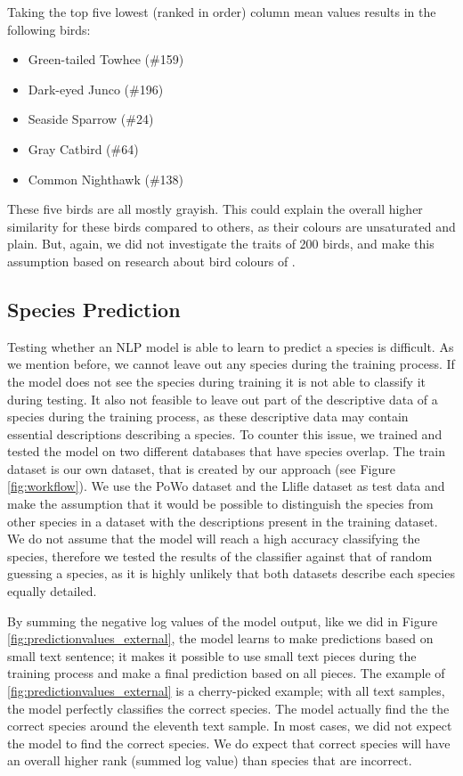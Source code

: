 \documentclass[a4paper, 12pt, oneside]{book} %
\begin{document}
Taking the top five lowest (ranked in order) column mean values results in the following birds: 
\begin{itemize}
    \setlength\itemsep{-0.25em}
    \item Green-tailed Towhee (\#159)
    \item Dark-eyed Junco (\#196)
    \item Seaside Sparrow (\#24)
    \item Gray Catbird (\#64)
    \item Common Nighthawk (\#138)
\end{itemize}
These five birds are all mostly grayish.
This could explain the overall higher similarity for these birds compared to others, as their colours are unsaturated and plain.
But, again, we did not investigate the traits of 200 birds, and make this assumption based on research about bird colours of \textcite{delhey_colour_2016}.

\subsection{Species Prediction}
Testing whether an NLP model is able to learn to predict a species is difficult.
As we mention before, we cannot leave out any species during the training process.
If the model does not see the species during training it is not able to classify it during testing.
It also not feasible to leave out part of the descriptive data of a species during the training process, as these descriptive data may contain essential descriptions describing a species.
To counter this issue, we trained and tested the model on two different databases that have species overlap.
The train dataset is our own dataset, that is created by our approach (see Figure \ref{fig:workflow}).
We use the PoWo dataset and the Llifle dataset as test data and make the assumption that it would be possible to distinguish the species from other species in a dataset with the descriptions present in the training dataset.
We do not assume that the model will reach a high accuracy classifying the species, therefore we tested the results of the classifier against that of random guessing a species, as it is highly unlikely that both datasets describe each species equally detailed.

By summing the negative log values of the model output, like we did in Figure \ref{fig:predictionvalues_external}, the model learns to make predictions based on small text sentence; it makes it possible to use small text pieces during the training process and make a final prediction based on all pieces.
The example of \ref{fig:predictionvalues_external} is a cherry-picked example; with all text samples, the model perfectly classifies the correct species.
The model actually find the the correct species around the eleventh text sample.
In most cases, we did not expect the model to find the correct species. 
We do expect that correct species will have an overall higher rank (summed log value) than species that are incorrect.
\end{document}
